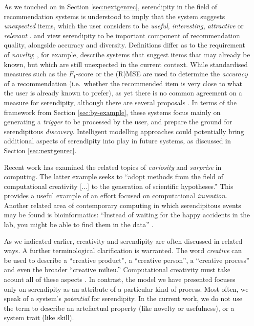 As we touched on in Section \ref{sec:nextgenrec}, serendipity in the
field of recommendation systems is understood to imply that the system
suggests \emph{unexpected} items, which the user considers to be
\emph{useful}, \emph{interesting}, \emph{attractive} or
\emph{relevant} \cite{foster2003serendipity,Toms2000}.
 and  view serendipity to be
important component of recommendation quality, alongside accuracy and
diversity.
Definitions differ as to the requirement of \emph{novelty};
, for example, describe systems that suggest
items that may already be known, but which are still unexpected in the
current context.  While standardised measures such as the $F_1$-score
or the (R)MSE are used to determine the \emph{accuracy} of a
recommendation (i.e.~whether the recommended item is very close to
what the user is already known to prefer), as yet there is no common
agreement on a measure for serendipity, although there are several
proposals
\cite{Murakami2008,Adamopoulos2011,McCay-Peet2011,iaquinta2010can}.
In terms of the framework from Section \ref{sec:by-example}, these
systems focus mainly on generating a \emph{trigger} to be processed
by the user, and prepare the ground for serendipitous \emph{discovery}.
Intelligent modelling approaches could potentially bring additional aspects
of serendipity into play in future systems, as  discussed in Section
\ref{sec:nextgenrec}.

Recent work has examined the related topics of \emph{curiosity}
\cite{wu2013curiosity} and \emph{surprise} \cite{grace2014using} in
computing.  The latter example seeks to ``adopt methods from the field
of computational creativity [$\ldots$] to the generation of scientific
hypotheses.''  This provides a useful example of an effort focused on
computational \emph{invention}.  Another related area of contemporary
computing in which serendipitous events may be found is
bioinformatics: ``Instead of waiting for the happy accidents in the
lab, you might be able to find them in the data''
\cite[p.~70]{kennedy2016inventology}.

As we indicated earlier, creativity and serendipity are often
discussed in related ways.  A further terminological clarification is
warranted.  The word \emph{creative} can be used to describe a
``creative product'', a ``creative person'', a ``creative process''
and even the broader ``creative milieu.''  Computational creativity
must take acount all of these aspects \cite{4Pjournal-version}.  In
contrast, the model we have presented focuses only on serendipity as
an attribute of a particular kind of process.  Most often, we speak of
a system's \emph{potential} for serendipity.  In the current work, we
do not use the term to describe an artefactual property (like novelty
or usefulness), or a system trait (like skill).

